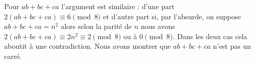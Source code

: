 {\begin{enumerate}
{Pour $ab+bc+ca$ l'argument est similaire : 
d'une part $2(ab+bc+ca)\equiv 6 \pmod{8}$
et d'autre part si, par l'absurde, on suppose $ab+bc+ca=n^2$ alors
selon la parit\'e de $n$ nous avons $2(ab+bc+ca)\equiv 2n^2 \equiv 2 \pmod{8}$
ou \`a $0 \pmod{8}$. Dans les deux cas cela aboutit \`a une contradiction. Nous avons montrer que
$ab+bc+ca$ n'est pas un carr\'e.}
\end{enumerate}
}
